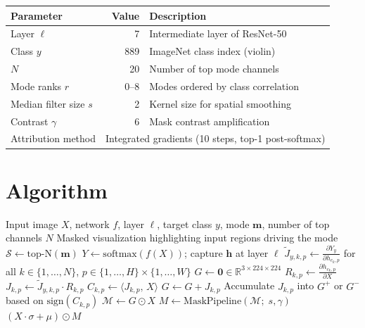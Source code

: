 \documentclass[11pt]{article}
\begin{document}
\begin{table}[h]
\centering
\begin{tabular}{lrl}
\toprule
Parameter & Value & Description \\
\midrule
Layer $\ell$ & 7 & Intermediate layer of ResNet-50 \\
Class $y$ & 889 & ImageNet class index (violin) \\
$N$ & 20 & Number of top mode channels \\
Mode ranks $r$ & 0--8 & Modes ordered by class correlation \\
Median filter size $s$ & 2 & Kernel size for spatial smoothing \\
Contrast $\gamma$ & 6 & Mask contrast amplification \\
Attribution method & \multicolumn{2}{l}{Integrated gradients (10 steps, top-1 post-softmax)} \\
\bottomrule
\end{tabular}
\end{table}

\section{Algorithm}

\begin{algorithm}[H]
\caption{Mode-Specific Input Visualization}
\label{alg:vis}
\begin{algorithmic}[1]
\Require Input image $X$, network $f$, layer $\ell$, target class $y$, mode $\mathbf{m}$, number of top channels $N$
\Ensure Masked visualization highlighting input regions driving the mode
\State $\mathcal{S} \gets \mathrm{top\text{-}N}(\mathbf{m})$ 
\State $Y \gets \mathrm{softmax}(f(X))$; capture $\mathbf{h}$ at layer $\ell$
\State $\tilde{J}_{y,k,p} \gets \frac{\partial Y_y}{\partial h_{c_k, p}}$ for all $k \in \{1,\ldots,N\}$, $p \in \{1,\ldots,H\} \times \{1,\ldots,W\}$ 
\State $G \gets \mathbf{0} \in \mathbb{R}^{3 \times 224 \times 224}$
        \State $R_{k,p} \gets \frac{\partial h_{c_k,p}}{\partial X}$ 
        \State $J_{k,p} \gets \tilde{J}_{y,k,p} \cdot R_{k,p}$ 
        \State $C_{k,p} \gets \langle J_{k,p},\, X \rangle$ 
        \State $G \gets G + J_{k,p}$
        \State Accumulate $J_{k,p}$ into $G^+$ or $G^-$ based on $\mathrm{sign}(C_{k,p})$
    \EndFor
\EndFor
\State $\mathcal{M} \gets G \odot X$ 
\State $M \gets \mathrm{MaskPipeline}(\mathcal{M};\; s, \gamma)$ 
\State \Return $(X \cdot \sigma + \mu) \odot M$
\end{algorithmic}
\end{algorithm}
\end{document}
